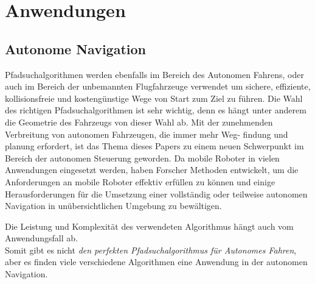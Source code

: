 \chapter{Anwendungen}
\label{Anwendungen}

\section{Autonome Navigation}
\label{Autonome Navigation}

Pfadsuchalgorithmen werden ebenfalls im Bereich des Autonomen Fahrens, oder auch im Bereich der unbemannten Flugfahrzeuge verwendet
um sichere, effiziente, kollisionsfreie und kostengünstige Wege von Start zum Ziel zu führen. Die Wahl des richtigen Pfadsuchalgorithmen
ist sehr wichtig, denn es hängt unter anderem die Geometrie des Fahrzeugs von dieser Wahl ab.
Mit der zunehmenden Verbreitung von autonomen Fahrzeugen, die immer mehr Weg- findung und planung erfordert, ist das Thema dieses Papers 
zu einem neuen Schwerpunkt im Bereich der autonomen Steuerung geworden.
Da mobile Roboter in vielen Anwendungen eingesetzt werden, haben Forscher Methoden entwickelt, um die 
Anforderungen an mobile Roboter effektiv erfüllen zu können und einige Herausforderungen für die Umsetzung einer vollständig oder
teilweise autonomen Navigation in unübersichtlichen Umgebung zu bewältigen.\cite{Karur:21}

Die Leistung und Komplexität des verwendeten Algorithmus hängt auch vom Anwendungsfall ab. \cite{Karur:21}\\
Somit gibt es nicht \emph{den perfekten Pfadsuchalgorithmus für Autonomes Fahren}, aber es finden viele verschiedene Algorithmen eine 
Anwendung in der autonomen Navigation.